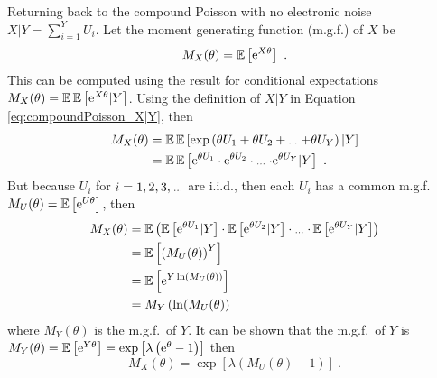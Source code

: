 Returning back to the compound Poisson with no electronic noise $X|Y = \sum_{i=1}^{Y}U_i$. Let the moment generating function (m.g.f.) of $X$ be
\begin{equation}
  M_X(\theta)=\operatorname{\mathbb{E}}\left[\mathrm{e}^{X\theta}\right]
  \ .
\end{equation}
This can be computed using the result for conditional expectations $M_X(\theta)=\operatorname{\mathbb{E}}\operatorname{\mathbb{E}}\left[\mathrm{e}^{X\theta}|Y\right]$. Using the definition of $X|Y$ in Equation \eqref{eq:compoundPoisson_X|Y}, then
\begin{align}
  M_X(\theta)&=\expectation\expectation\left[\exp\left(\theta U_1 + \theta U_2 + \dotdotdot + \theta U_Y\right)|Y\right]
  \\
  &=\expectation\expectation\left[\euler^{\theta U_1}\cdot\euler^{\theta U_2}\cdot\dotdotdot\cdot\euler^{\theta U_Y}|Y\right]
  \ .
\end{align}
But because $U_i$ for $i=1,2,3,\dotdotdot$ are i.i.d., then each $U_i$ has a common m.g.f.~$M_U(\theta)=\operatorname{\mathbb{E}}\left[\mathrm{e}^{U\theta}\right]$, then
\begin{align}
  M_X(\theta)&=\expectation\left(
    \expectation\left[\euler^{\theta U_1}|Y\right]\cdot
    \expectation\left[\euler^{\theta U_2}|Y\right]\cdot
    \dotdotdot \cdot
    \expectation\left[\euler^{\theta U_Y}|Y\right]
  \right)
  \\
  &=\expectation\left[\left(M_U(\theta)\right)^Y\right]
  \\
  &=\expectation\left[\euler^{Y\ln(M_U(\theta))}\right]
  \\
  & = M_Y\left(\ln(M_U(\theta)\right)
\end{align}
where $M_Y(\theta)$ is the m.g.f.~of $Y$. It can be shown that the m.g.f.~of $Y$ is
$
  M_Y(\theta)=\operatorname{\mathbb{E}}\left[\mathrm{e}^{Y\theta}\right]=
  \exp
  \left[
    \lambda
    \left(
      \mathrm{e}^\theta-1
    \right)
  \right]
$
then
\begin{equation}
  M_X(\theta)=
  \exp\left[
    \lambda
    \left(
      M_U(\theta)-1
    \right)
  \right]
  \ .
\end{equation}

